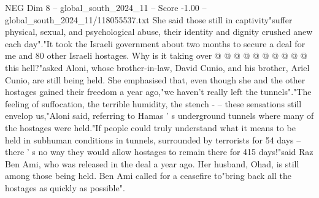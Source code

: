 \begin{textsample}{NEG Dim 8 – global\_south\_2024\_11 – Score -1.00 – global\_south\_2024\_11/118055537.txt}
She said those still in captivity"suffer physical, sexual, and psychological abuse, their identity and dignity crushed anew each day"."It took the Israeli government about two months to secure a deal for me and 80 other Israeli hostages.
Why is it taking over @ @ @ @ @ @ @ @ @ @ this hell?"asked Aloni, whose brother-in-law, David Cunio, and his brother, Ariel Cunio, are still being held.
She emphasised that, even though she and the other hostages gained their freedom a year ago,"we haven't really left the tunnels"."The feeling of suffocation, the terrible humidity, the stench - -- these sensations still envelop us,"Aloni said, referring to Hamas ' s underground tunnels where many of the hostages were held."If people could truly understand what it means to be held in subhuman conditions in tunnels, surrounded by terrorists for 54 days -- there ' s no way they would allow hostages to remain there for 415 days!"said Raz Ben Ami, who was released in the deal a year ago.
Her husband, Ohad, is still among those being held.
Ben Ami called for a ceasefire to"bring back all the hostages as quickly as possible".

\end{textsample}
